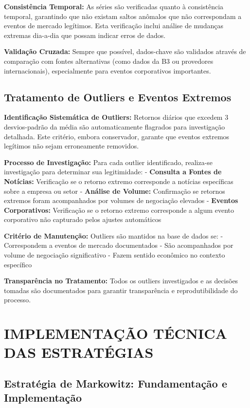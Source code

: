 \textbf{Consistência Temporal:} As séries são verificadas quanto à consistência temporal, garantindo que não existam saltos anômalos que não correspondam a eventos de mercado legítimos. Esta verificação inclui análise de mudanças extremas dia-a-dia que possam indicar erros de dados.

\textbf{Validação Cruzada:} Sempre que possível, dados-chave são validados através de comparação com fontes alternativas (como dados da B3 ou provedores internacionais), especialmente para eventos corporativos importantes.

\subsection{Tratamento de Outliers e Eventos Extremos}

\textbf{Identificação Sistemática de Outliers:} Retornos diários que excedem 3 desvios-padrão da média são automaticamente flagrados para investigação detalhada. Este critério, embora conservador, garante que eventos extremos legítimos não sejam erroneamente removidos.

\textbf{Processo de Investigação:} Para cada outlier identificado, realiza-se investigação para determinar sua legitimidade:
- \textbf{Consulta a Fontes de Notícias:} Verificação se o retorno extremo corresponde a notícias específicas sobre a empresa ou setor
- \textbf{Análise de Volume:} Confirmação se retornos extremos foram acompanhados por volumes de negociação elevados
- \textbf{Eventos Corporativos:} Verificação se o retorno extremo corresponde a algum evento corporativo não capturado pelos ajustes automáticos

\textbf{Critério de Manutenção:} Outliers são mantidos na base de dados se:
- Correspondem a eventos de mercado documentados
- São acompanhados por volume de negociação significativo
- Fazem sentido econômico no contexto específico

\textbf{Transparência no Tratamento:} Todos os outliers investigados e as decisões tomadas são documentados para garantir transparência e reprodutibilidade do processo.

\section{IMPLEMENTAÇÃO TÉCNICA DAS ESTRATÉGIAS}

\subsection{Estratégia de Markowitz: Fundamentação e Implementação}


